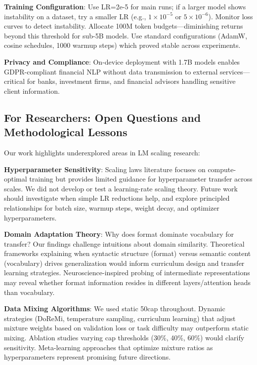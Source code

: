 \textbf{Training Configuration}: Use LR=2e-5 for main runs; if a larger model shows instability on a dataset, try a smaller LR (e.g., $1\times10^{-5}$ or $5\times10^{-6}$). Monitor loss curves to detect instability. Allocate 100M token budgets—diminishing returns beyond this threshold for sub-5B models. Use standard configurations (AdamW, cosine schedules, 1000 warmup steps) which proved stable across experiments.

\textbf{Privacy and Compliance}: On-device deployment with 1.7B models enables GDPR-compliant financial NLP without data transmission to external services—critical for banks, investment firms, and financial advisors handling sensitive client information.

\subsection{For Researchers: Open Questions and Methodological Lessons}

Our work highlights underexplored areas in LM scaling research:

\textbf{Hyperparameter Sensitivity}: Scaling laws literature \parencite{kaplan2020scaling, hoffmann2022training} focuses on compute-optimal training but provides limited guidance for hyperparameter transfer across scales. We did not develop or test a learning-rate scaling theory. Future work should investigate when simple LR reductions help, and explore principled relationships for batch size, warmup steps, weight decay, and optimizer hyperparameters.

\textbf{Domain Adaptation Theory}: Why does format dominate vocabulary for transfer? Our findings challenge intuitions about domain similarity. Theoretical frameworks explaining when syntactic structure (format) versus semantic content (vocabulary) drives generalization would inform curriculum design and transfer learning strategies. Neuroscience-inspired probing of intermediate representations may reveal whether format information resides in different layers/attention heads than vocabulary.

\textbf{Data Mixing Algorithms}: We used static 50cap throughout. Dynamic strategies (DoReMi, temperature sampling, curriculum learning) that adjust mixture weights based on validation loss or task difficulty may outperform static mixing. Ablation studies varying cap thresholds (30\%, 40\%, 60\%) would clarify sensitivity. Meta-learning approaches that optimize mixture ratios as hyperparameters represent promising future directions.

